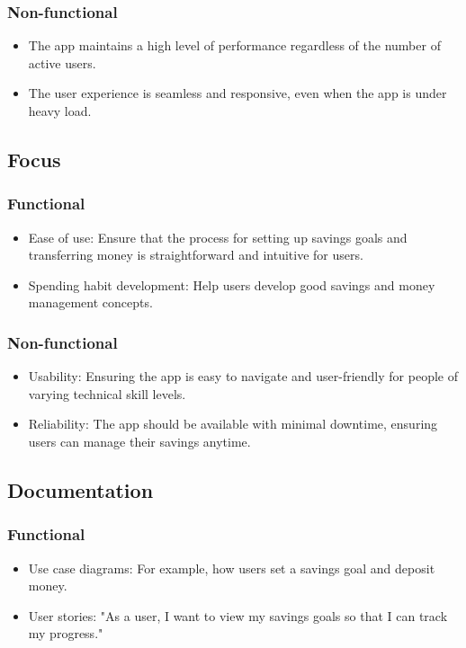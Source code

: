 \documentclass{article}
\begin{document}
\subsubsection{Non-functional}
\begin{itemize}
    \item The app maintains a high level of performance regardless of the number of active users.
    \item The user experience is seamless and responsive, even when the app is under heavy load.
\end{itemize}

\subsection{Focus}
\subsubsection{Functional}
\begin{itemize}
    \item Ease of use: Ensure that the process for setting up savings goals and transferring money is straightforward and intuitive for users.
    \item Spending habit development: Help users develop good savings and money management concepts.
\end{itemize}
\subsubsection{Non-functional}
\begin{itemize}
    \item Usability: Ensuring the app is easy to navigate and user-friendly for people of varying technical skill levels.
    \item Reliability: The app should be available with minimal downtime, ensuring users can manage their savings anytime.
\end{itemize}

\subsection{Documentation}
\subsubsection{Functional}
\begin{itemize}
    \item Use case diagrams: For example, how users set a savings goal and deposit money.
    \item User stories: "As a user, I want to view my savings goals so that I can track my progress."
\end{itemize}
\end{document}
